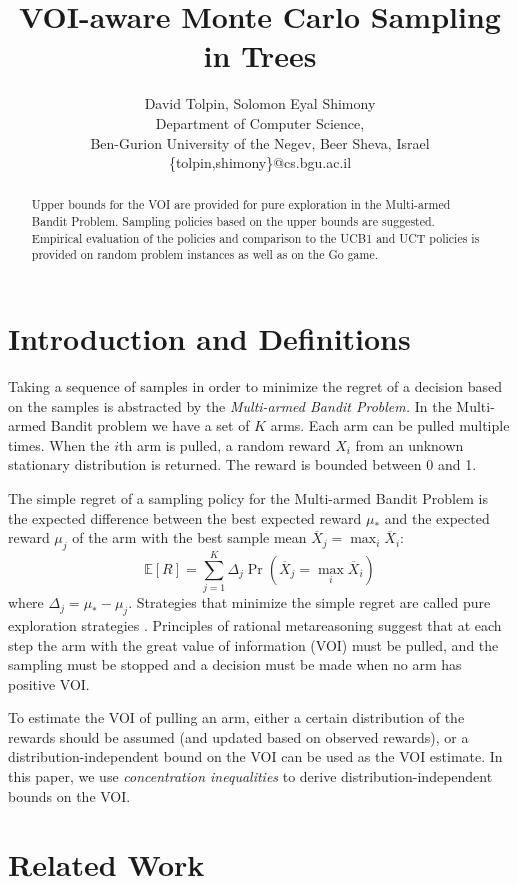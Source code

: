 \documentclass{article}
\title{VOI-aware Monte Carlo Sampling in Trees}
\author {David Tolpin, Solomon Eyal Shimony \\
Department of Computer Science, \\
Ben-Gurion University of the Negev, Beer Sheva, Israel \\
\{tolpin,shimony\}@cs.bgu.ac.il}
\newcommand {\IE} {\ensuremath {\mathbb{E}}}
\begin{document}
\maketitle

\begin{abstract}
Upper bounds for the VOI are provided for pure exploration in the
Multi-armed Bandit Problem. Sampling policies based on the upper
bounds are suggested. Empirical evaluation of the policies and
comparison to the UCB1 and UCT policies is provided
on random problem instances as well as on the Go game.
\end{abstract}


\section{Introduction and Definitions}

Taking a sequence of samples in order to minimize the
regret of a decision based on the samples is abstracted by the
{\em Multi-armed Bandit Problem.} In the Multi-armed Bandit problem
we have a set of $K$ arms. Each arm can be pulled multiple
times. When the $i$th arm is pulled, a random reward $X_i$ from an
unknown stationary distribution is returned.  The reward is bounded
between 0 and 1.

The simple regret of a sampling policy for the Multi-armed Bandit
Problem is the expected difference between the best expected reward
$\mu_*$ and the expected reward $\mu_j$ of the arm with the best sample mean
$\overline X_j=\max_i\overline X_i$:
\begin{equation}
\label{eqn:simple-regret}
\IE[R]=\sum_{j=1}^K\Delta_j\Pr(\overline X_j=\max_i\overline X_i)
\end{equation}
where $\Delta_j=\mu_*-\mu_j$.
Strategies that minimize the simple regret are called pure exploration
strategies \cite{Bubeck.pure}. Principles of rational metareasoning
\cite{Russell.right} suggest that at each step the arm with the great
value of information (VOI) must be pulled, and the sampling must be
stopped and a decision must be made when no arm has positive VOI. 

To estimate the VOI of pulling an arm, either a certain 
distribution of the rewards should be assumed (and updated based on
observed rewards), or a distribution-independent bound on the VOI can be
used as the VOI estimate. In this paper, we use {\em concentration inequalities}
to derive distribution-independent bounds on the VOI.

\section{Related Work}
\end{document}
